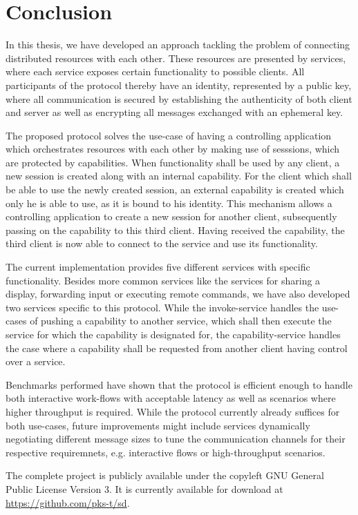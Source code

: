 \section{Conclusion}

In this thesis, we have developed an approach tackling the problem of connecting distributed resources with each other.
These resources are presented by services, where each service exposes certain functionality to possible clients.
All participants of the protocol thereby have an identity, represented by a public key, where all communication is secured by establishing the authenticity of both client and server as well as encrypting all messages exchanged with an ephemeral key.

The proposed protocol solves the use-case of having a controlling application which orchestrates resources with each other by making use of sesssions, which are protected by capabilities.
When functionality shall be used by any client, a new session is created along with an internal capability.
For the client which shall be able to use the newly created session, an external capability is created which only he is able to use, as it is bound to his identity.
This mechanism allows a controlling application to create a new session for another client, subsequently passing on the capability to this third client.
Having received the capability, the third client is now able to connect to the service and use its functionality.

The current implementation provides five different services with specific functionality.
Besides more common services like the services for sharing a display, forwarding input or executing remote commands, we have also developed two services specific to this protocol.
While the invoke-service handles the use-cases of pushing a capability to another service, which shall then execute the service for which the capability is designated for, the capability-service handles the case where a capability shall be requested from another client having control over a service.

Benchmarks performed have shown that the protocol is efficient enough to handle both interactive work-flows with acceptable latency as well as scenarios where higher throughput is required.
While the protocol currently already suffices for both use-cases, future improvements might include services dynamically negotiating different message sizes to tune the communication channels for their respective requiremnets, e.g. interactive flows or high-throughput scenarios.

The complete project is publicly available under the copyleft GNU General Public License Version 3.
It is currently available for download at \url{https://github.com/pks-t/sd}.

